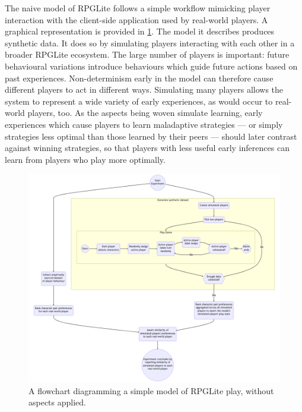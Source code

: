 The naive model of RPGLite follows a simple workflow mimicking player
interaction with the client-side application used by real-world players.
A graphical representation is provided in \cref{fig:naive_model}. 
 The model it describes produces synthetic data.
It does so by simulating players interacting with each other in a broader
RPGLite ecosystem. The large number of players is important: future behavioural
variations introduce behaviours which guide future actions based on past
experiences. Non-determinism early in the model can therefore cause different
players to act in different ways. Simulating many players allows the system to
represent a wide variety of early experiences, as would occur to real-world
players, too. As the aspects being woven simulate learning, early experiences
which cause players to learn maladaptive strategies --- or simply strategies
less optimal than those learned by their peers --- should later contrast against
winning strategies, so that players with less useful early inferences can learn
from players who play more optimally.

\begin{figure}
  \centering
  \includegraphics[width=\columnwidth]{60_optimisation_with_aspects/diagrams/naive_model.png}
  \caption{A flowchart diagramming a simple model of RPGLite play, without
  aspects applied.}
  \label{fig:naive_model}
\end{figure}


